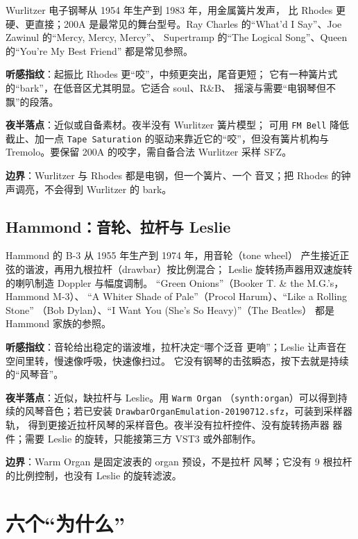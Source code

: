 Wurlitzer 电子钢琴从 1954 年生产到 1983 年，用金属簧片发声，
比 Rhodes 更硬、更直接；200A 是最常见的舞台型号。Ray Charles
的“What'd I Say”、Joe Zawinul 的“Mercy, Mercy, Mercy”、
Supertramp 的“The Logical Song”、Queen 的“You're My Best Friend”
都是常见参照。

\textbf{听感指纹}：起振比 Rhodes 更“咬”，中频更突出，尾音更短；
它有一种簧片式的“bark”，在低音区尤其明显。它适合 soul、R\&B、
摇滚与需要“电钢琴但不飘”的段落。

\textbf{夜半落点}：近似或自备素材。夜半没有 Wurlitzer 簧片模型；
可用 \texttt{FM Bell} 降低截止、加一点 \texttt{Tape Saturation}
的驱动来靠近它的“咬”，但没有簧片机构与 Tremolo。要保留
200A 的咬字，需自备合法 Wurlitzer 采样 SFZ。

\textbf{边界}：Wurlitzer 与 Rhodes 都是电钢，但一个簧片、一个
音叉；把 Rhodes 的钟声调亮，不会得到 Wurlitzer 的 bark。

\subsection{Hammond：音轮、拉杆与 Leslie}
\label{sec:iconic-hammond}

Hammond 的 B-3 从 1955 年生产到 1974 年，用音轮（tone wheel）
产生接近正弦的谐波，再用九根拉杆（drawbar）按比例混合；
Leslie 旋转扬声器用双速旋转的喇叭制造 Doppler 与幅度调制。
“Green Onions”（Booker T. \& the M.G.'s，Hammond M-3）、
“A Whiter Shade of Pale”（Procol Harum）、“Like a Rolling Stone”
（Bob Dylan）、“I Want You (She's So Heavy)”（The Beatles）
都是 Hammond 家族的参照。

\textbf{听感指纹}：音轮给出稳定的谐波堆，拉杆决定“哪个泛音
更响”；Leslie 让声音在空间里转，慢速像呼吸，快速像扫过。
它没有钢琴的击弦瞬态，按下去就是持续的“风琴音”。

\textbf{夜半落点}：近似，缺拉杆与 Leslie。用 \texttt{Warm Organ}
（\texttt{synth:organ}）可以得到持续的风琴音色；若已安装
\texttt{DrawbarOrganEmulation}\allowbreak\texttt{-20190712.sfz}，可装到采样器轨，
得到更接近拉杆风琴的采样音色。夜半没有拉杆控件、没有旋转扬声器
器件；需要 Leslie 的旋转，只能接第三方 VST3 或外部制作。

\textbf{边界}：Warm Organ 是固定波表的 organ 预设，不是拉杆
风琴；它没有 9 根拉杆的比例控制，也没有 Leslie 的旋转滤波。

\section{六个“为什么”}
\label{sec:iconic-why}

